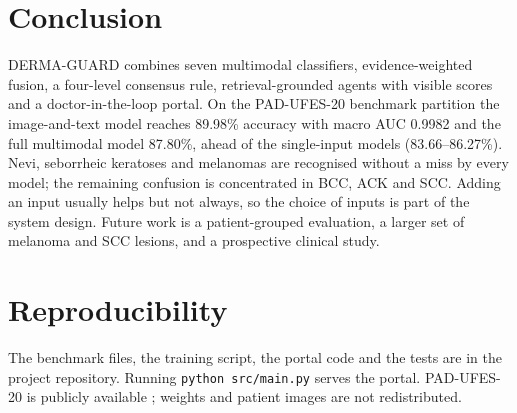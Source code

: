 \documentclass[conference]{IEEEtran}
\begin{document}
\section{Conclusion}
DERMA-GUARD combines seven multimodal classifiers, evidence-weighted fusion, a four-level consensus rule, retrieval-grounded agents with visible scores and a doctor-in-the-loop portal. On the PAD-UFES-20 benchmark partition the image-and-text model reaches 89.98\% accuracy with macro AUC 0.9982 and the full multimodal model 87.80\%, ahead of the single-input models (83.66--86.27\%). Nevi, seborrheic keratoses and melanomas are recognised without a miss by every model; the remaining confusion is concentrated in BCC, ACK and SCC. Adding an input usually helps but not always, so the choice of inputs is part of the system design. Future work is a patient-grouped evaluation, a larger set of melanoma and SCC lesions, and a prospective clinical study.

\section*{Reproducibility}
The benchmark files, the training script, the portal code and the tests are in the project repository. Running \texttt{python src/main.py} serves the portal. PAD-UFES-20 is publicly available \cite{pacheco2020}; weights and patient images are not redistributed.
\end{document}
